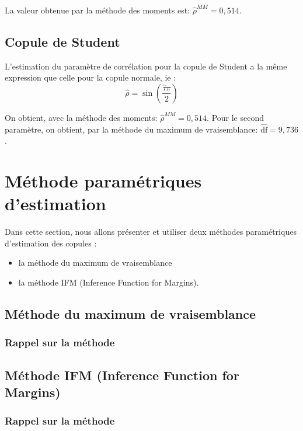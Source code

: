 La valeur obtenue par la méthode des moments est: $\widehat{\rho}^{MM} = 0,514$.

\subsection{Copule de Student}

L'estimation du paramètre de corrélation pour la copule de Student a la même expression que celle pour la copule normale, ie :
$$
\widehat{\rho} = \operatorname{sin}\left(\frac{\widehat{\tau} \pi}{2} \right)
$$

On obtient, avec la méthode des moments: $\widehat{\rho}^{MM} = 0,514$. Pour le second paramètre, on obtient, par la méthode du maximum de vraisemblance: $\widehat{\text{df}} = 9,736$.

\section{Méthode paramétriques d'estimation}

Dans cette section, nous allons présenter et utiliser deux méthodes paramétriques d'estimation
des copules :

\begin{itemize}
\item la méthode du maximum de vraisemblance
\item la méthode IFM (Inference Function for Margins).
\end{itemize}

\subsection{Méthode du maximum de vraisemblance}

\subsubsection{Rappel sur la méthode}


\subsection{Méthode IFM (Inference Function for Margins)}

\subsubsection{Rappel sur la méthode}

